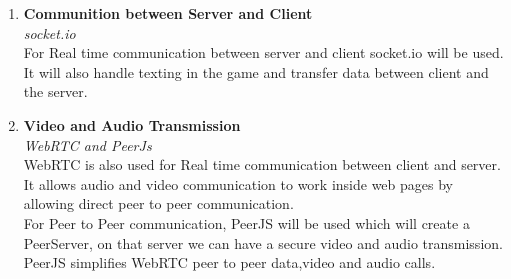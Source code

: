 \documentclass[12pt]{extarticle}
\begin{document}
\begin{enumerate}
\item \textbf{Communition between Server and Client}
\\	\textit{socket.io}
\\	For Real time communication between server and client socket.io will be used.
	\\It will also handle texting in the game and transfer data between client and the server.
\item \textbf{Video and Audio Transmission}
\\
	\textit{WebRTC and PeerJs} 
	\\WebRTC is also used for Real time communication between client and server. It allows audio and video communication to work inside web pages by allowing direct peer to peer communication.
	\\For Peer to Peer communication, PeerJS will be used which will create a PeerServer, on that server we can have a secure video and audio transmission. PeerJS simplifies WebRTC peer to peer data,video and audio calls.
\end{enumerate}
\end{document}
